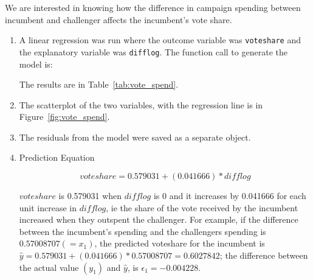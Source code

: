 \documentclass[12pt,letterpaper]{article}
\begin{document}
\noindent We are interested in knowing how the difference in campaign spending between incumbent and challenger affects the incumbent's vote share. 
	\begin{enumerate}
		\item A linear regression was run where the outcome variable was \texttt{voteshare} and 
		the explanatory variable was \texttt{difflog}.	
		  The function call to generate the model is:

	    
	    The results are in Table~\ref{tab:vote_spend}. 

		\item The scatterplot of the two variables, with the regression line is in Figure~\ref{fig:vote_spend}. 	

		
		\item The residuals from the model were saved as a  separate object.	
	    

		\item Prediction Equation 
		
    \[voteshare = 0.579031 + (0.041666) * difflog\]

    $voteshare$ is 0.579031 when $difflog$ is 0 and it increases by 0.041666 
    for each unit increase in $difflog$, ie the share of the vote received by the 
    incumbent increased when they outspent the challenger.  For example, if the difference between the incumbent's spending and the challengers spending is $0.57008707 (=x_1)$, the predicted voteshare for the incumbent is $\hat{y} = 0.579031 + (0.041666) * 0.57008707 = 0.6027842$; the difference between the actual value $(y_1)$ and $\hat{y}$, is $\epsilon_1 = -0.004228$.  

	\end{enumerate}
      
\end{document}
